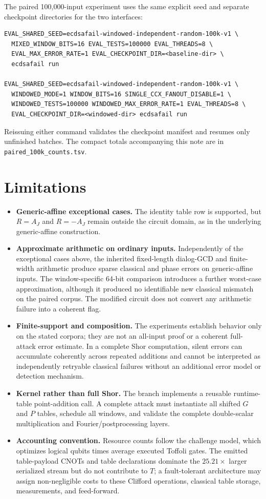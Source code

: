 \documentclass[10pt]{article}
\newcommand{\code}[1]{\texttt{#1}}
\begin{document}
\newpage
The paired 100,000-input experiment uses the same explicit seed and separate checkpoint directories for the two interfaces:
\begin{lstlisting}
EVAL_SHARED_SEED=ecdsafail-windowed-independent-random-100k-v1 \
  MIXED_WINDOW_BITS=16 EVAL_TESTS=100000 EVAL_THREADS=8 \
  EVAL_MAX_ERROR_RATE=1 EVAL_CHECKPOINT_DIR=<baseline-dir> \
  ecdsafail run

EVAL_SHARED_SEED=ecdsafail-windowed-independent-random-100k-v1 \
  WINDOWED_MODE=1 WINDOW_BITS=16 SINGLE_CCX_FANOUT_DISABLE=1 \
  WINDOWED_TESTS=100000 WINDOWED_MAX_ERROR_RATE=1 EVAL_THREADS=8 \
  EVAL_CHECKPOINT_DIR=<windowed-dir> ecdsafail run
\end{lstlisting}
Reissuing either command validates the checkpoint manifest and resumes only unfinished batches. The compact totals accompanying this note are in \code{paired\_100k\_counts.tsv}.

\section{Limitations}

\begin{itemize}
\item \textbf{Generic-affine exceptional cases.} The identity table row is supported, but $R=A_J$ and $R=-A_J$ remain outside the circuit domain, as in the underlying generic-affine construction.
\item \textbf{Approximate arithmetic on ordinary inputs.} Independently of the exceptional cases above, the inherited fixed-length dialog-GCD and finite-width arithmetic produce sparse classical and phase errors on generic-affine inputs. The window-specific 64-bit comparison introduces a further worst-case approximation, although it produced no identifiable new classical mismatch on the paired corpus. The modified circuit does not convert any arithmetic failure into a coherent flag.
\item \textbf{Finite-support and composition.} The experiments establish behavior only on the stated corpora; they are not an all-input proof or a coherent full-attack error estimate. In a complete Shor computation, silent errors can accumulate coherently across repeated additions and cannot be interpreted as independently retryable classical failures without an additional error model or detection mechanism.
\item \textbf{Kernel rather than full Shor.} The branch implements a reusable runtime-table point-addition call. A complete attack must instantiate all shifted $G$ and $P$ tables, schedule all windows, and validate the complete double-scalar multiplication and Fourier/postprocessing layers.
\item \textbf{Accounting convention.} Resource counts follow the challenge model, which optimizes logical qubits times average executed Toffoli gates. The emitted table-payload CNOTs and table declarations dominate the $25.21\times$ larger serialized stream but do not contribute to $T$; a fault-tolerant architecture may assign non-negligible costs to these Clifford operations, classical table storage, measurements, and feed-forward.
\end{itemize}
\end{document}
